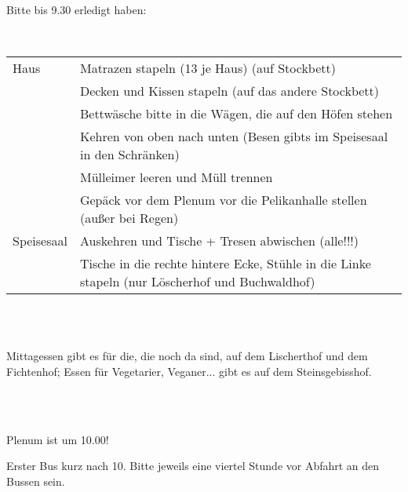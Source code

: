 \documentclass[16pt,a4,landscape]{article}
\begin{document}
\noindent
\begin{Large}Bitte bis 9.30 erledigt haben:\end{Large}\\
\begin{tabular}{ll}
Haus& Matrazen stapeln (13 je Haus) (auf Stockbett) \\
& Decken und Kissen stapeln (auf das andere Stockbett) \\
& Bettw\"asche bitte in die W\"agen, die auf den H\"ofen stehen\\
& Kehren von oben nach unten (Besen gibts im Speisesaal in den Schr\"anken)  \\
& M\"ulleimer leeren und M\"ull trennen \\
& Gep\"ack vor dem Plenum vor die Pelikanhalle stellen (au\ss er bei Regen) \\
Speisesaal & Auskehren und Tische + Tresen abwischen (alle!!!) \\
& Tische in die rechte hintere Ecke, St\"uhle in die Linke stapeln (nur L\"oscherhof und Buchwaldhof)
\end{tabular} \\ \bigskip \\
\noindent
\begin{Large}Mittagessen gibt es f\"ur die, die noch da sind, auf dem Lischerthof und dem Fichtenhof; Essen f\"ur Vegetarier, Veganer... gibt es auf dem Steinsgebisshof. \end{Large}\\ \bigskip \\ \bigskip

\begin{Large}Plenum ist um 10.00!\end{Large}
Erster Bus kurz nach 10. Bitte jeweils eine viertel Stunde vor Abfahrt an den Bussen sein.
\end{document}
